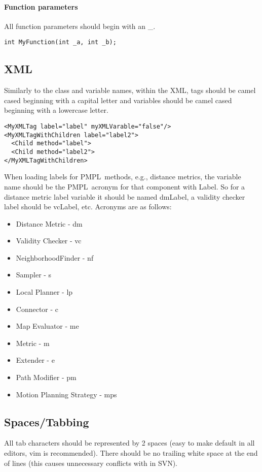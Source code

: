 \documentclass[12pt]{article}
\newcommand{\pmpl}{PMPL}
\begin{document}
\paragraph{Function parameters}

All function parameters should begin with an \_.

\begin{lstlisting}
int MyFunction(int _a, int _b);
\end{lstlisting}

\subsection{XML}
Similarly to the class and variable names, within the XML, tags should be camel
cased beginning with a capital letter and variables should be camel cased
beginning with a lowercase letter.

\begin{lstlisting}
<MyXMLTag label="label" myXMLVarable="false"/>
<MyXMLTagWithChildren label="label2">
  <Child method="label">
  <Child method="label2">
</MyXMLTagWithChildren>
\end{lstlisting}

When loading labels for \pmpl\ methods, e.g., distance metrics, the variable
name should be the \pmpl\ acronym for that component with Label. So for a
distance metric label variable it should be named dmLabel, a validity checker
label should be vcLabel, etc. Acronyms are as follows:

\begin{itemize}
  \item Distance Metric - dm
  \item Validity Checker - vc
  \item NeighborhoodFinder - nf
  \item Sampler - s
  \item Local Planner - lp
  \item Connector - c
  \item Map Evaluator - me
  \item Metric - m
  \item Extender - e
  \item Path Modifier - pm
  \item Motion Planning Strategy - mps
\end{itemize}

\subsection{Spaces/Tabbing}
All tab characters should be represented by 2 spaces (easy to make default in
all editors, vim is recommended). There should be no trailing white space at the
end of lines (this causes unnecessary conflicts with in SVN).
\end{document}
